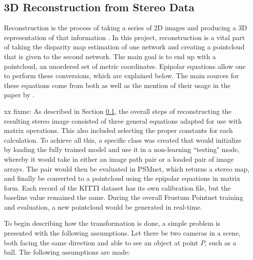 \subsection{3D Reconstruction from Stereo Data}
\label{sect_reconstruct}
Reconstruction is the process of taking a series of 2D images and producing a 3D representation of that information \cite{szeliski_computer_2010}. In this project, reconstruction is a vital part of taking the disparity map estimation of one network and creating a pointcloud that is given to the second network. The main goal is to end up with a pointcloud, an unordered set of metric coordinates. Epipolar equations allow one to perform these conversions, which are explained below. The main sources for these equations come from both \cite{szeliski_computer_2010} as well as the mention of their usage in the paper by \cite{wang_pseudo-lidar_2019}. 

xx fixme: As described in Section \ref{sect_reconstruct}, the overall steps of reconstructing the resulting stereo image consisted of three general equations adapted for use with matrix operations. This also included selecting the proper constants for each calculation. To achieve all this, a specific class was created that would initialize by loading the fully trained model and use it in a non-learning ``testing" mode, whereby it would take in either an image path pair or a loaded pair of image arrays. The pair would then be evaluated in PSMnet, which returns a stereo map, and finally be converted to a pointcloud using the epipolar equations in matrix form. Each record of the KITTI dataset has its own calibration file, but the baseline value remained the same. During the overall Frustum Pointnet training and evaluation, a new pointcloud would be generated in real-time.

To begin describing how the transformation is done, a simple problem is presented with the following assumptions. Let there be two cameras in a scene, both facing the same direction and able to see an object at point $P$, such as a ball. The following assumptions are made: 

